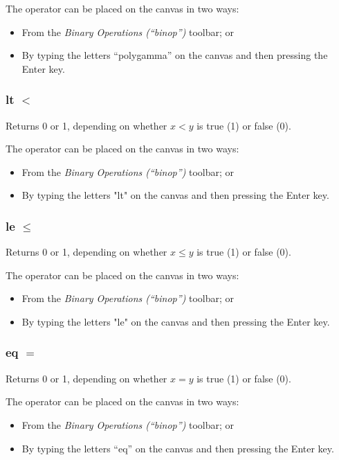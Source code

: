 The operator can be placed on the canvas in two ways:
\begin{itemize}
\item From the \emph{Binary Operations (``binop'')} toolbar; or 
\item By typing the letters ``polygamma'' on the canvas and then pressing
the Enter key.
\end{itemize}

\subsubsection{lt $<$}


\label{Operation:lt} Returns 0 or 1, depending on whether $x<y$
is true (1) or false (0).

The operator can be placed on the canvas in two ways:
\begin{itemize}
\item From the \emph{Binary Operations (``binop'')} toolbar; or 
\item By typing the letters "lt" on the canvas and then pressing the Enter
key. 
\end{itemize}

\subsubsection{le $\le$}


\label{Operation:le} Returns 0 or 1, depending on whether $x\le y$
is true (1) or false (0).

The operator can be placed on the canvas in two ways:
\begin{itemize}
\item From the \emph{Binary Operations (``binop'')} toolbar; or 
\item By typing the letters "le" on the canvas and then pressing the Enter
key. 
\end{itemize}

\subsubsection{eq $=$}


\label{Operation:eq} Returns 0 or 1, depending on whether $x=y$
is true (1) or false (0).

The operator can be placed on the canvas in two ways:
\begin{itemize}
\item From the \emph{Binary Operations (``binop'')} toolbar; or 
\item By typing the letters ``eq'' on the canvas and then pressing the Enter
key. 
\end{itemize}

